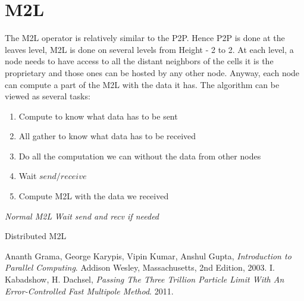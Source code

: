 \documentclass[12pt,letterpaper,titlepage]{report}
\begin{document}
\section{M2L}
The M2L operator is relatively similar to the P2P.
Hence P2P is done at the leaves level, M2L is done on several levels from Height - 2 to 2.
At each level, a node needs to have access to all the distant neighbors of the cells it is the proprietary and those ones can be hosted by any other node.
Anyway, each node can compute a part of the M2L with the data it has.
The algorithm can be viewed as several tasks:
\begin{enumerate}
\item Compute to know what data has to be sent
\item All gather to know what data has to be received
\item Do all the computation we can without the data from other nodes
\item Wait $send/receive$
\item Compute M2L with the data we received
\end{enumerate}
\BlankLine
\begin{algorithm}[H]
\linesnumbered
\SetLine
{}
\BlankLine
{}
\emph{Normal M2L}\;
\emph{Wait send and recv if needed}\;
\BlankLine
\caption{Distributed M2L}
\end{algorithm}
\begin{thebibliography}{9}
   Ananth Grama, George Karypis, Vipin Kumar, Anshul Gupta,
   \emph{Introduction to Parallel Computing}.
   Addison Wesley, Massachusetts,
   2nd Edition,
   2003.
   I. Kabadshow, H. Dachsel,
   \emph{Passing The Three Trillion Particle Limit With An Error-Controlled Fast Multipole Method}.
   2011.
\end{thebibliography}
\end{document}
